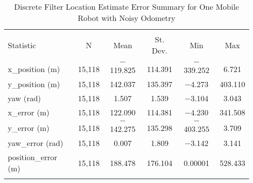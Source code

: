 
\begin{table}[htbp] \centering 
  \caption{Discrete Filter Location Estimate Error Summary for One Mobile Robot with Noisy Odometry} 
  \label{tab:one_mobile_no_gps_discrete_summary} 
\begin{tabular}{@{\extracolsep{5pt}}lccccc} 
\\[-1.8ex]\hline 
\hline \\[-1.8ex] 
Statistic & \multicolumn{1}{c}{N} & \multicolumn{1}{c}{Mean} & \multicolumn{1}{c}{St. Dev.} & \multicolumn{1}{c}{Min} & \multicolumn{1}{c}{Max} \\ 
\hline \\[-1.8ex] 
x\_position (m) & 15,118 & $-$119.825 & \num{114.391} & $-$339.252 & \num{6.721} \\ 
y\_position (m) & 15,118 & \num{142.037} & \num{135.397} & $-$4.273 & \num{403.110} \\ 
yaw (rad) & 15,118 & \num{1.507} & \num{1.539} & $-$3.104 & \num{3.043} \\ 
x\_error (m) & 15,118 & \num{122.090} & \num{114.381} & $-$4.230 & \num{341.508} \\ 
y\_error (m) & 15,118 & $-$142.275 & \num{135.298} & $-$403.255 & \num{3.709} \\ 
yaw\_error (rad) & 15,118 & \num{0.007} & \num{1.809} & $-$3.142 & \num{3.141} \\ 
position\_error (m) & 15,118 & \num{188.478} & \num{176.104} & \num{0.00001} & \num{528.433} \\ 
\hline \\[-1.8ex] 
\end{tabular} 
\end{table} 
